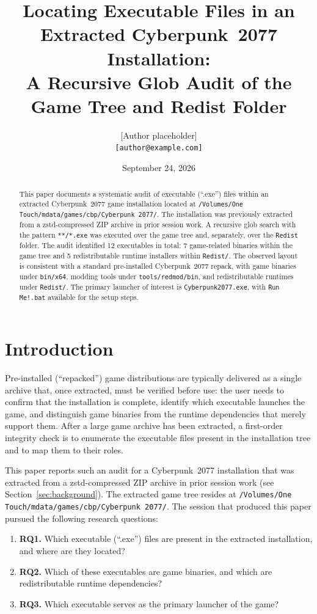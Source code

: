 \documentclass[11pt]{article}
\title{Locating Executable Files in an Extracted Cyberpunk~2077 Installation:\\ A Recursive Glob Audit of the Game Tree and Redist Folder}
\author{[Author placeholder]\\ \texttt{[author@example.com]}}
\date{September 24, 2026}
\begin{document}
\maketitle

\begin{abstract}
This paper documents a systematic audit of executable (``.exe'') files within
an extracted Cyberpunk~2077 game installation located at
\texttt{/Volumes/One Touch/mdata/games/cbp/Cyberpunk 2077/}. The installation
was previously extracted from a zstd-compressed ZIP archive in prior session
work. A recursive glob search with the pattern \texttt{**/*.exe} was executed
over the game tree and, separately, over the \texttt{Redist} folder. The audit
identified 12 executables in total: 7 game-related binaries within the game
tree and 5 redistributable runtime installers within \texttt{Redist/}. The
observed layout is consistent with a standard pre-installed Cyberpunk~2077
repack, with game binaries under \texttt{bin/x64}, modding tools under
\texttt{tools/redmod/bin}, and redistributable runtimes under
\texttt{Redist/}. The primary launcher of interest is
\texttt{Cyberpunk2077.exe}, with \texttt{Run Me!.bat} available for the setup
steps.
\end{abstract}

\section{Introduction}
\label{sec:introduction}

Pre-installed (``repacked'') game distributions are typically delivered as a
single archive that, once extracted, must be verified before use: the user
needs to confirm that the installation is complete, identify which executable
launches the game, and distinguish game binaries from the runtime dependencies
that merely support them. After a large game archive has been extracted, a
first-order integrity check is to enumerate the executable files present in the
installation tree and to map them to their roles.

This paper reports such an audit for a Cyberpunk~2077 installation that was
extracted from a zstd-compressed ZIP archive in prior session work (see
Section~\ref{sec:background}). The extracted game tree resides at
\texttt{/Volumes/One Touch/mdata/games/cbp/Cyberpunk 2077/}. The session that
produced this paper pursued the following research questions:

\begin{enumerate}
  \item \textbf{RQ1.} Which executable (``.exe'') files are present in the
        extracted installation, and where are they located?
  \item \textbf{RQ2.} Which of these executables are game binaries, and which
        are redistributable runtime dependencies?
  \item \textbf{RQ3.} Which executable serves as the primary launcher of the
        game?
\end{enumerate}
\end{document}
